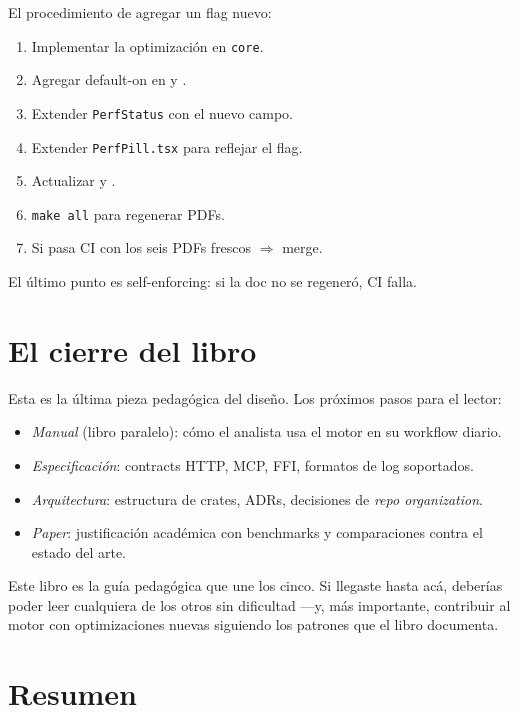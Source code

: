 El procedimiento de agregar un flag nuevo:

\begin{enumerate}
    \item Implementar la optimización en \texttt{core}.
    \item Agregar default-on en 
    y .
    \item Extender \texttt{PerfStatus} con el nuevo campo.
    \item Extender \texttt{PerfPill.tsx} para reflejar el flag.
    \item Actualizar  y
    .
    \item \texttt{make all} para regenerar PDFs.
    \item Si pasa CI con los seis PDFs frescos $\Rightarrow$
    merge.
\end{enumerate}

\noindent
El último punto es self-enforcing: si la doc no se regeneró, CI
falla.

\section{El cierre del libro}

Esta es la última pieza pedagógica del diseño. Los próximos pasos
para el lector:

\begin{itemize}
    \item \emph{Manual} (libro paralelo): cómo el analista usa el
    motor en su workflow diario.
    \item \emph{Especificación}: contracts HTTP, MCP, FFI, formatos
    de log soportados.
    \item \emph{Arquitectura}: estructura de crates, ADRs,
    decisiones de \emph{repo organization}.
    \item \emph{Paper}: justificación académica con benchmarks y
    comparaciones contra el estado del arte.
\end{itemize}

\noindent
Este libro es la guía pedagógica que une los cinco. Si llegaste
hasta acá, deberías poder leer cualquiera de los otros sin
dificultad ---y, más importante, contribuir al motor con
optimizaciones nuevas siguiendo los patrones que el libro documenta.

\section{Resumen}

